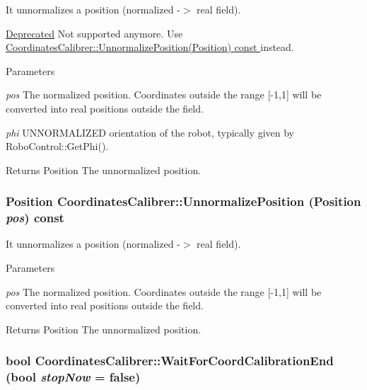 It unnormalizes a position (normalized -\/$>$ real field). 

\begin{Desc}
\item[\hyperlink{deprecated__deprecated000002}{Deprecated}]Not supported anymore. Use \hyperlink{classCoordinatesCalibrer_a8522193b13196313d001c589e7845bd3}{CoordinatesCalibrer::UnnormalizePosition(Position) const }instead.\end{Desc}

\begin{DoxyParams}{Parameters}
\item[{\em pos}]The normalized position. Coordinates outside the range \mbox{[}-\/1,1\mbox{]} will be converted into real positions outside the field. \item[{\em phi}]UNNORMALIZED orientation of the robot, typically given by RoboControl::GetPhi(). \end{DoxyParams}
\begin{DoxyReturn}{Returns}
Position The unnormalized position. 
\end{DoxyReturn}
\hypertarget{classCoordinatesCalibrer_a8522193b13196313d001c589e7845bd3}{
\subsubsection[{UnnormalizePosition}]{\setlength{\rightskip}{0pt plus 5cm}Position CoordinatesCalibrer::UnnormalizePosition (Position {\em pos}) const}}
\label{classCoordinatesCalibrer_a8522193b13196313d001c589e7845bd3}


It unnormalizes a position (normalized -\/$>$ real field). 


\begin{DoxyParams}{Parameters}
\item[{\em pos}]The normalized position. Coordinates outside the range \mbox{[}-\/1,1\mbox{]} will be converted into real positions outside the field. \end{DoxyParams}
\begin{DoxyReturn}{Returns}
Position The unnormalized position. 
\end{DoxyReturn}
\hypertarget{classCoordinatesCalibrer_a99563ba6e43f839bf1b10f55cf155125}{
\subsubsection[{WaitForCoordCalibrationEnd}]{\setlength{\rightskip}{0pt plus 5cm}bool CoordinatesCalibrer::WaitForCoordCalibrationEnd (bool {\em stopNow} = {\ttfamily false})}}
\label{classCoordinatesCalibrer_a99563ba6e43f839bf1b10f55cf155125}



